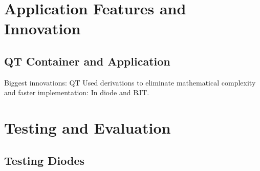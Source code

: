 \documentclass{article}
\begin{document}
\newpage
\section{Application Features and Innovation}
\subsection{QT Container and Application}
Biggest innovations: 
QT
Used derivations to eliminate mathematical complexity and faster implementation: In diode and BJT. 



\section{Testing and Evaluation}
\subsection{Testing Diodes}
\end{document}
